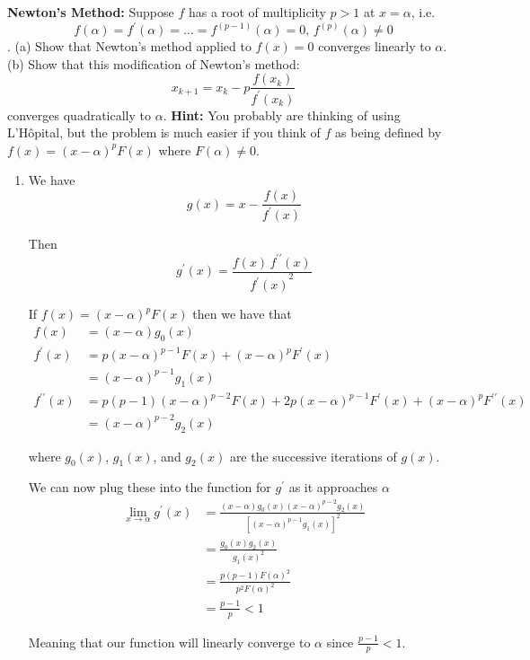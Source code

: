 \textbf{Newton's Method:} Suppose $f$ has a root of multiplicity $p>1$ at
$x = \alpha$, i.e. \[f(\alpha) = f^\prime(\alpha) = \dots =
f^{(p-1)}(\alpha) = 0\text{,    }f^{(p)} (\alpha) \ne 0\]. (a) Show
that Newton's method applied to $f(x) = 0$ converges linearly to
$\alpha$. (b) Show that this modification of Newton's
method: \[x_{k+1} = x_k - p \frac{f(x_k)}{f^\prime(x_k)}\] converges
quadratically to $\alpha$. \textbf{Hint:} You probably are thinking of
using L'H\^{o}pital, but the problem is much easier if you think of
$f$ as being defined by $f(x) = (x-\alpha)^p F(x)$ where $F(\alpha)
\ne 0$.

{\color{blue}

\begin{enumerate}

\item

We have
\[
g(x) = x - \frac{f(x)}{f^\prime(x)}
\]

Then
\[
g^\prime(x) = \frac{f(x)\, f^{\prime \prime}(x)}{{f^\prime(x)}^2}
\]

If $f(x) = (x-\alpha)^p F(x)$ then we have that
\[
\begin{aligned}
f(x) &= (x - \alpha) g_0(x) \\
f^\prime (x) &= p(x - \alpha)^{p-1} F(x) + (x - \alpha)^p F^\prime (x) \\
&= (x - \alpha)^{p-1} g_1(x) \\
f^{\prime \prime} (x) &= p(p - 1)(x - \alpha)^{p-2} F(x) + 2p (x - \alpha)^{p-1}
F^\prime(x) + (x - \alpha)^p F^{\prime \prime} (x) \\
&= (x - \alpha)^{p-2} g_2(x)
\end{aligned}
\]

where $g_0(x)$, $g_1(x)$, and $g_2(x)$ are the successive iterations of $g(x)$.

We can now plug these into the function for $g^\prime$ as it
approaches $\alpha$
\[
\begin{aligned}
\lim_{x \to \alpha} g^\prime(x) &=
\frac{(x - \alpha) g_0(x) (x - \alpha)^{p-2} g_2(x)}
{\left[(x - \alpha)^{p-1} g_1(x)\right]^2} \\
&= \frac{g_0(x) g_2(x)}{g_1(x)^2} \\
&= \frac{p(p - 1)F(\alpha)^2}{p^2 F(\alpha)^2} \\
&= \frac{p - 1}{p} < 1
\end{aligned}
\]

Meaning that our function will linearly converge to $\alpha$ since
$\frac{p - 1}{p} < 1$.



\end{enumerate}}
